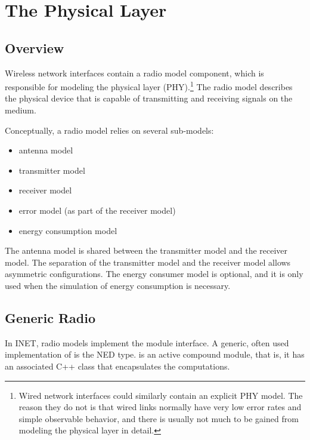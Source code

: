 \chapter{The Physical Layer}
\label{cha:physicallayer}

\section{Overview}
\label{sec:phy:overview}

Wireless network interfaces contain a radio model component, which is
responsible for modeling the physical layer (PHY).\footnote{Wired network interfaces
could similarly contain an explicit PHY model. The reason they do not is that
wired links normally have very low error rates and simple observable behavior,
and there is usually not much to be gained from modeling the physical layer in detail.}
The radio model describes the physical device that is capable of transmitting
and receiving signals on the medium.

Conceptually, a radio model relies on several sub-models:

\begin{itemize}
  \item antenna model
  \item transmitter model
  \item receiver model
  \item error model (as part of the receiver model)
  \item energy consumption model
\end{itemize}

The antenna model is shared between the transmitter model and the receiver model.
The separation of the transmitter model and the receiver model allows
asymmetric configurations. The energy consumer model is optional, and
it is only used when the simulation of energy consumption is necessary.




\section{Generic Radio}
\label{sec:phy:generic-radio}

In INET, radio models implement the  module interface.
A generic, often used implementation of  is the
 NED type.  is an active compound module,
that is, it has an associated C++ class that encapsulates the computations.

